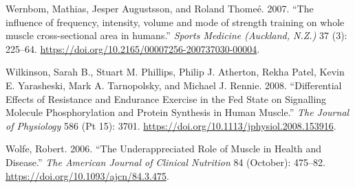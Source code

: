 \documentclass[
  letterpaper,
  DIV=11,
  numbers=noendperiod]{scrreprt}
\newlength{\cslhangindent}
\newlength{\cslentryspacingunit} %
\newenvironment{CSLReferences}[2] %
 {%
  \setlength{\parindent}{0pt}
  \ifodd #1
  \let\oldpar\par
  \def\par{\hangindent=\cslhangindent\oldpar}
  \fi
  \setlength{\parskip}{#2\cslentryspacingunit}
 }%
 {}
\begin{document}
\begin{CSLReferences}{1}{0}
\leavevmode{}%
Wernbom, Mathias, Jesper Augustsson, and Roland Thomeé. 2007. {``The
influence of frequency, intensity, volume and mode of strength training
on whole muscle cross-sectional area in humans.''} \emph{Sports Medicine
(Auckland, N.Z.)} 37 (3): 225--64.
\url{https://doi.org/10.2165/00007256-200737030-00004}.

\leavevmode{}%
Wilkinson, Sarah B., Stuart M. Phillips, Philip J. Atherton, Rekha
Patel, Kevin E. Yarasheski, Mark A. Tarnopolsky, and Michael J. Rennie.
2008. {``Differential Effects of Resistance and Endurance Exercise in
the Fed State on Signalling Molecule Phosphorylation and Protein
Synthesis in Human Muscle.''} \emph{The Journal of Physiology} 586 (Pt
15): 3701. \url{https://doi.org/10.1113/jphysiol.2008.153916}.

\leavevmode{}%
Wolfe, Robert. 2006. {``The Underappreciated Role of Muscle in Health
and Disease.''} \emph{The American Journal of Clinical Nutrition} 84
(October): 475--82. \url{https://doi.org/10.1093/ajcn/84.3.475}.

\end{CSLReferences}
\end{document}
